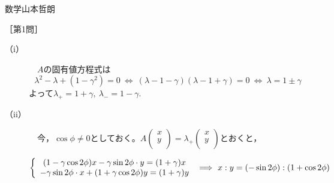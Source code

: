 \documentclass[fleqn]{jbook}
\begin{document}
\begin{answer}{数学}{山本哲朗}
\setcounter{equation}{0}

［第1問］\\


    \begin{description}
        \item[{\rm （i）}] 　$A$の固有値方程式は
\begin{equation}
\lambda^2-\lambda+(1-\gamma^2)=0 
~\iff~ (\lambda-1-\gamma)(\lambda-1+\gamma)=0 
~\iff~ \lambda=1\pm \gamma\nonumber
\end{equation}
よって\qquad $\lambda_+=1+\gamma,~\lambda_-=1-\gamma .$

        \item[{\rm （ii）}] 　今，$\cos\phi\neq 0$としておく。$A\left(
\begin{array}{c}
x \\
y \\
\end{array}
\right)
=\lambda_+\left(
\begin{array}{c}
x \\
y \\
\end{array}
\right)$とおくと，

\begin{equation}
\left\{ {\begin{array}{*{20}c}
   {(1-\gamma\cos 2\phi)x-\gamma\sin 2\phi\cdot y=(1+\gamma)x}  \\
   {-\gamma\sin 2\phi\cdot x+(1+\gamma\cos 2\phi)y=(1+\gamma)y}  \\
\end{array}} \right.~\Longrightarrow~x:y=(-\sin 2\phi):(1+\cos 2\phi)\nonumber
\end{equation}


\end{description}
\end{answer}
\end{document}

